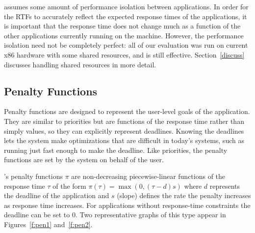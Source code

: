 \pacora assumes some amount of performance isolation between
applications.  In order for the RTFs to accurately reflect the
expected response times of the applications, it is important that the
response time does not change much as a function of the other
applications currently running on the machine.  However, the
performance isolation need not be completely perfect: all of our
evaluation was run on current x86 hardware with some shared resources,
and \pacora is still effective. Section~\ref{discuss} discusses
handling shared resources in more detail.

\subsection{Penalty Functions}
Penalty functions are designed to represent the user-level goals of
the application. They are similar to priorities but are functions of
the response time rather than simply values, so they can explicitly
represent deadlines.  Knowing the deadlines lets the system make
optimizations that are difficult in today's systems, such as running
just fast enough to make the deadline. Like priorities, the penalty
functions are set by the system on behalf of the user.

\pacora's penalty functions $\pi$ are non-decreasing piecewise-linear
functions of the response time $\tau$ of the form $\pi(\tau) = \max(0, (\tau - d)s)$
where $d$ represents the deadline of the application and $s$ (slope)
defines the rate the penalty increases as response time increases. For
applications without response-time constraints the deadline can be set
to $0$. Two representative graphs of this type appear in
Figures~\ref{f:pen1} and~\ref{f:pen2}.


